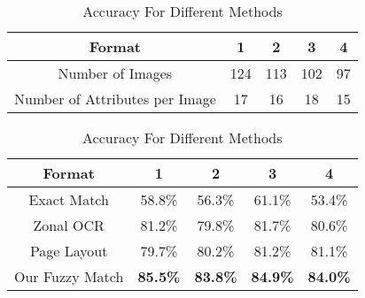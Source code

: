 %


\begin{table}[!hbp]
\RawFloats
\centering

\begin{minipage}[b]{0.45\hsize}\centering
\tiny

\begin{tabular}{|c|c|c|c|c|}
\hline
Format & 1 & 2 & 3 & 4\\
\hline \hline
Number of Images & 124 & 113 & 102 & 97\\ 
\hline
Number of Attributes per Image & 17 & 16 & 18 & 15 \\
\hline
\end{tabular}
\caption{Statistics for The Dataset}
\label{tab:statis}
\end{minipage}
\hfill
\begin{minipage}[b]{0.45\hsize}\centering
\tiny
\begin{tabular}{|c|c|c|c|c|}
\hline
Format & 1 & 2 & 3 & 4\\
\hline \hline
Exact Match & 58.8\% & 56.3\% & 61.1\% & 53.4\% \\
\hline
Zonal OCR & 81.2\% & 79.8\% & 81.7\% & 80.6\% \\
\hline
Page Layout & 79.7\% & 80.2\% & 81.2\% & 81.1\% \\
\hline
Our Fuzzy Match & {\bf 85.5\%} & {\bf 83.8\%} & {\bf 84.9\%} & {\bf 84.0\%}\\ 
\hline
\end{tabular}
\caption{Accuracy For Different Methods}
\label{tab:compare}
\end{minipage}

\end{table}

